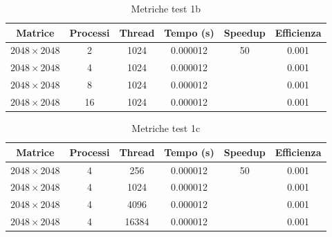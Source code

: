 \begin{table}[h]
    \centering
    \begin{tabular}{cccccc}
        \hline
        \textbf{Matrice}   & \textbf{Processi} & \textbf{Thread} & \textbf{Tempo (s)} & \textbf{Speedup} & \textbf{Efficienza} \\ \hline
        $2048 \times 2048$ & 2                 & 1024            & 0.000012           & 50               & 0.001               \\
        $2048 \times 2048$ & 4                 & 1024            & 0.000012           &                  & 0.001               \\
        $2048 \times 2048$ & 8                 & 1024            & 0.000012           &                  & 0.001               \\
        $2048 \times 2048$ & 16                & 1024            & 0.000012           &                  & 0.001               \\ \hline
    \end{tabular}
    \caption{Metriche test 1b}
\end{table}

\begin{table}[h]
    \centering
    \begin{tabular}{cccccc}
        \hline
        \textbf{Matrice}   & \textbf{Processi} & \textbf{Thread} & \textbf{Tempo (s)} & \textbf{Speedup} & \textbf{Efficienza} \\ \hline
        $2048 \times 2048$ & 4                 & 256             & 0.000012           & 50               & 0.001               \\
        $2048 \times 2048$ & 4                 & 1024            & 0.000012           &                  & 0.001               \\
        $2048 \times 2048$ & 4                 & 4096            & 0.000012           &                  & 0.001               \\
        $2048 \times 2048$ & 4                 & 16384           & 0.000012           &                  & 0.001               \\ \hline
    \end{tabular}
    \caption{Metriche test 1c}
\end{table}

